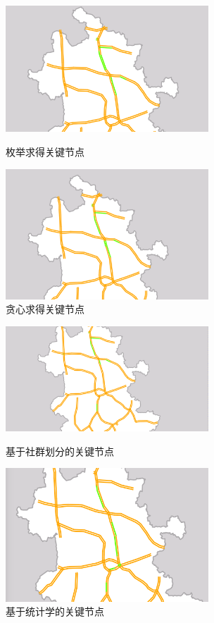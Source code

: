 				\begin{figure}
				\begin{minipage}{0.5\linewidth}
					\centering
					\includegraphics[width=3in]{picture/meiju}
					\caption{枚举求得关键节点}
					\label{jihe1}
				\end{minipage}%
				\begin{minipage}{0.5\linewidth}
					\centering
					\includegraphics[width=3in]{picture/tanxin}
					\caption{贪心求得关键节点}
					\label{jihe2}
				\end{minipage}
				\end{figure}

				\begin{figure}
				\begin{minipage}{0.5\linewidth}
					\centering
					\includegraphics[width=3in]{picture/fenqun}
					\caption{基于社群划分的关键节点}
					\label{jihe3}
				\end{minipage}%
				\begin{minipage}{0.5\linewidth}
					\centering
					\includegraphics[width=3in]{picture/hotsection}
					\caption{基于统计学的关键节点}
					\label{jihe4}
				\end{minipage}
				\end{figure}

